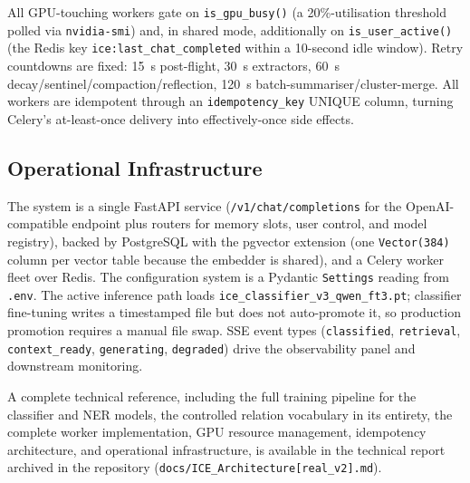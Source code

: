 \documentclass[11pt,a4paper]{article}
\begin{document}
All GPU-touching workers gate on \texttt{is\_gpu\_busy()} (a 20\%-utilisation threshold polled via \texttt{nvidia-smi}) and, in shared mode, additionally on \texttt{is\_user\_active()} (the Redis key \texttt{ice:last\_chat\_completed} within a 10-second idle window). Retry countdowns are fixed: 15~s post-flight, 30~s extractors, 60~s decay/sentinel/compaction/reflection, 120~s batch-summariser/cluster-merge. All workers are idempotent through an \texttt{idempotency\_key} UNIQUE column, turning Celery's at-least-once delivery into effectively-once side effects.

\subsection{Operational Infrastructure}

The system is a single FastAPI service (\texttt{/v1/chat/completions} for the OpenAI-compatible endpoint plus routers for memory slots, user control, and model registry), backed by PostgreSQL with the pgvector extension (one \texttt{Vector(384)} column per vector table because the embedder is shared), and a Celery worker fleet over Redis. The configuration system is a Pydantic \texttt{Settings} reading from \texttt{.env}. The active inference path loads \texttt{ice\_classifier\_v3\_qwen\_ft3.pt}; classifier fine-tuning writes a timestamped file but does not auto-promote it, so production promotion requires a manual file swap. SSE event types (\texttt{classified}, \texttt{retrieval}, \texttt{context\_ready}, \texttt{generating}, \texttt{degraded}) drive the observability panel and downstream monitoring.

A complete technical reference, including the full training pipeline for the classifier and NER models, the controlled relation vocabulary in its entirety, the complete worker implementation, GPU resource management, idempotency architecture, and operational infrastructure, is available in the technical report archived in the repository (\texttt{docs/ICE\_Architecture[real\_v2].md}).
\end{document}
